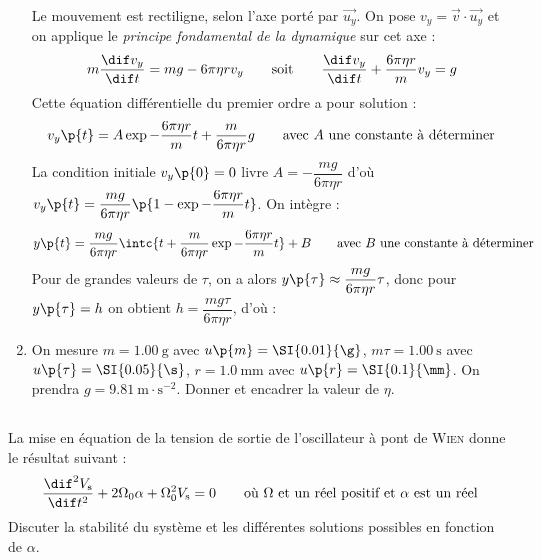\begin{enumerate}
{            Le mouvement est rectiligne, selon l'axe porté par $\vec{u_y}$. On pose $v_y = \vec{v} \cdot \vec{u_y}$ et on applique le \textit{principe fondamental de la dynamique} sur cet axe :
            \[ m\dfrac{\dif v_y}{\dif t} = mg - 6\pi\eta r v_y \qquad\text{soit}\qquad \dfrac{\dif v_y}{\dif t} + \dfrac{6\pi\eta r}{m}v_y = g\]
            Cette équation différentielle du premier ordre a pour solution :
            \[ v_y\p{t} = A\exp{-\dfrac{6\pi\eta r}{m}t} + \dfrac{m}{6\pi\eta r}g \qquad\text{avec} \ A \ \text{une constante à déterminer}\]
            La condition initiale $v_y\p{0} = 0$ livre $A = -\dfrac{mg}{6\pi\eta r}$ d'où $v_y\p{t} = \dfrac{mg}{6\pi\eta r}\p{1 - \exp{-\dfrac{6\pi\eta r}{m}t}}$. On intègre :
            \[ y\p{t} = \dfrac{mg}{6\pi\eta r}\intc{t + \dfrac{m}{6\pi\eta r}\exp{-\dfrac{6\pi\eta r}{m}t}} + B \qquad\text{avec} \ B \ \text{une constante à déterminer}\]
            Pour de grandes valeurs de $\tau$, on a alors $y\p{\tau} \approx \dfrac{mg}{6\pi\eta r}\tau$, donc pour $y\p{\tau} = h$ on obtient $h = \dfrac{mg\tau}{6\pi\eta r}$, d'où :
        }
        \nobefore\yesafter
        \boxansconc{
            \[ \eta = \dfrac{mg\tau}{6\pi rh}\]
        }
        \yesbefore
        
        \item On mesure $m = \SI{1.00}{\g}$ avec $u\p{m} = \SI{0.01}{\g}$, $m\tau= \SI{1.00}{\s}$ avec $u\p{\tau} = \SI{0.05}{\s}$, $r = \SI{1.0}{\mm}$ avec $u\p{r} = \SI{0.1}{\mm}$. On prendra $g = \SI{9.81}{\m \cdot \s^{-2}}$. Donner et encadrer la valeur de $\eta$.
    \end{enumerate}
    
    \subsection{}
    
    La mise en équation de la tension de sortie de l'oscillateur à pont de \textsc{Wien} donne le résultat suivant :
    \[ \dfrac{\dif^2 V_\text s}{\dif t^2} + 2\Omega_0 \alpha + \Omega_0^2V_\text s = 0 \qquad\text{où} \ \Omega \ \text{et un réel positif et} \ \alpha \ \text{est un réel}\]
    Discuter la stabilité du système et les différentes solutions possibles en fonction de $\alpha$.
    
    
